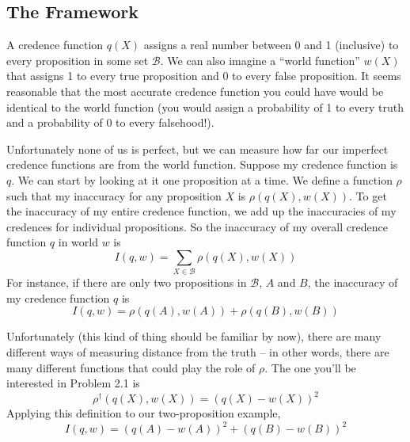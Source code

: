 \documentclass[leqno,12pt]{article}
\newcommand{\B}{\mathcal{B}}
\begin{document}
\subsection{The Framework}
A credence function $q(X)$ assigns a real number between 0 and 1 (inclusive) to every proposition in some set $\B$. We can also imagine a ``world function'' $w(X)$ that assigns 1 to every true proposition and 0 to every false proposition. It seems reasonable that the most accurate credence function you could have would be identical to the world function (you would assign a probability of 1 to every truth and a probability of 0 to every falsehood!).

Unfortunately none of us is perfect, but we can measure how far our imperfect credence functions are from the world function. Suppose my credence function is $q$. We can start by looking at it one proposition at a time. We define a function $\rho$ such that my inaccuracy for any proposition $X$ is $\rho(q(X),w(X))$. To get the inaccuracy of my entire credence function, we add up the inaccuracies of my credences for individual propositions. So the inaccuracy of my overall credence function $q$ in world $w$ is
\begin{equation*}
I(q,w) = \sum_{X \in \B}\rho(q(X),w(X))
\end{equation*}
For instance, if there are only two propositions in $\B$, $A$ and $B$, the inaccuracy of my credence function $q$ is
\begin{equation*}
I(q,w)=\rho(q(A), w(A))+\rho(q(B),w(B))
\end{equation*}

Unfortunately (this kind of thing should be familiar by now), there are many different ways of measuring distance from the truth -- in other words, there are many different functions that could play the role of $\rho$. The one you'll be interested in Problem 2.1 is
\begin{equation*}
\rho^{\dag}(q(X),w(X))=(q(X)-w(X))^2
\end{equation*}
Applying this definition to our two-proposition example, 
\begin{equation*}
I(q,w)=(q(A)-w(A))^2+(q(B)-w(B))^2
\end{equation*}
\end{document}
